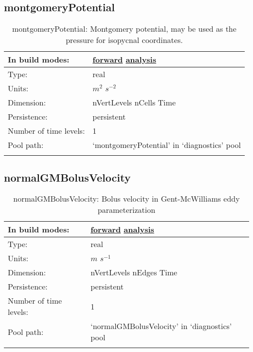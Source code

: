 \subsection[montgomeryPotential]{montgomeryPotential}
\label{subsec:var_sec_diagnostics_montgomeryPotential}
\begin{center}
\begin{longtable}{| p{2.0in} | p{4.0in} |}
        \hline 
        In build modes: & \hyperref[subsec:forward_var_tab_diagnostics]{forward} \hyperref[subsec:analysis_var_tab_diagnostics]{analysis} \\
        \hline 
        Type: & real \\
        \hline 
        Units: & $m^2$ $s^{-2}$ \\
        \hline 
        Dimension: & nVertLevels nCells Time \\
        \hline 
        Persistence: & persistent \\
        \hline 
        Number of time levels: & 1 \\
        \hline 
            Pool path: & `montgomeryPotential' in `diagnostics' pool \\
		 \hline 
    \caption{montgomeryPotential: Montgomery potential, may be used as the pressure for isopycnal coordinates.}
\end{longtable}
\end{center}
\subsection[normalGMBolusVelocity]{normalGMBolusVelocity}
\label{subsec:var_sec_diagnostics_normalGMBolusVelocity}
\begin{center}
\begin{longtable}{| p{2.0in} | p{4.0in} |}
        \hline 
        In build modes: & \hyperref[subsec:forward_var_tab_diagnostics]{forward} \hyperref[subsec:analysis_var_tab_diagnostics]{analysis} \\
        \hline 
        Type: & real \\
        \hline 
        Units: & $m$ $s^{-1}$ \\
        \hline 
        Dimension: & nVertLevels nEdges Time \\
        \hline 
        Persistence: & persistent \\
        \hline 
        Number of time levels: & 1 \\
        \hline 
            Pool path: & `normalGMBolusVelocity' in `diagnostics' pool \\
		 \hline 
    \caption{normalGMBolusVelocity: Bolus velocity in Gent-McWilliams eddy parameterization}
\end{longtable}
\end{center}
